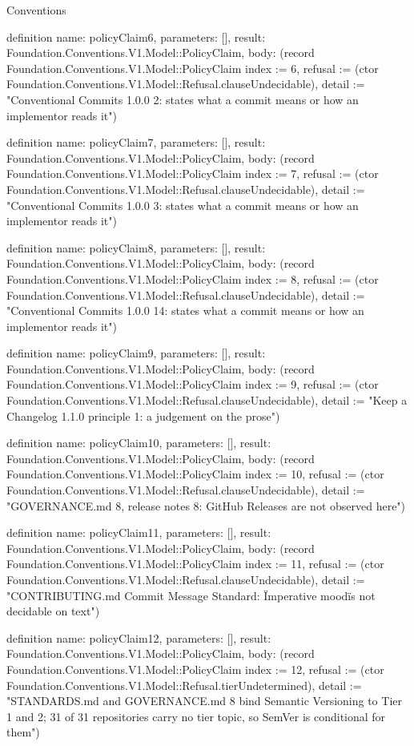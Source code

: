 \begin{lexlean}{Conventions}
\begin{semanticmodule}
definition{
  name: policyClaim6,
  parameters: [],
  result: Foundation.Conventions.V1.Model::PolicyClaim,
  body: (record Foundation.Conventions.V1.Model::PolicyClaim {index := 6, refusal := (ctor Foundation.Conventions.V1.Model::Refusal.clauseUndecidable), detail := "Conventional Commits 1.0.0 2: states what a commit means or how an implementor reads it"})
}

definition{
  name: policyClaim7,
  parameters: [],
  result: Foundation.Conventions.V1.Model::PolicyClaim,
  body: (record Foundation.Conventions.V1.Model::PolicyClaim {index := 7, refusal := (ctor Foundation.Conventions.V1.Model::Refusal.clauseUndecidable), detail := "Conventional Commits 1.0.0 3: states what a commit means or how an implementor reads it"})
}

definition{
  name: policyClaim8,
  parameters: [],
  result: Foundation.Conventions.V1.Model::PolicyClaim,
  body: (record Foundation.Conventions.V1.Model::PolicyClaim {index := 8, refusal := (ctor Foundation.Conventions.V1.Model::Refusal.clauseUndecidable), detail := "Conventional Commits 1.0.0 14: states what a commit means or how an implementor reads it"})
}

definition{
  name: policyClaim9,
  parameters: [],
  result: Foundation.Conventions.V1.Model::PolicyClaim,
  body: (record Foundation.Conventions.V1.Model::PolicyClaim {index := 9, refusal := (ctor Foundation.Conventions.V1.Model::Refusal.clauseUndecidable), detail := "Keep a Changelog 1.1.0 principle 1: a judgement on the prose"})
}

definition{
  name: policyClaim10,
  parameters: [],
  result: Foundation.Conventions.V1.Model::PolicyClaim,
  body: (record Foundation.Conventions.V1.Model::PolicyClaim {index := 10, refusal := (ctor Foundation.Conventions.V1.Model::Refusal.clauseUndecidable), detail := "GOVERNANCE.md 8, release notes 8: GitHub Releases are not observed here"})
}

definition{
  name: policyClaim11,
  parameters: [],
  result: Foundation.Conventions.V1.Model::PolicyClaim,
  body: (record Foundation.Conventions.V1.Model::PolicyClaim {index := 11, refusal := (ctor Foundation.Conventions.V1.Model::Refusal.clauseUndecidable), detail := "CONTRIBUTING.md Commit Message Standard: \"Imperative mood\" is not decidable on text"})
}

definition{
  name: policyClaim12,
  parameters: [],
  result: Foundation.Conventions.V1.Model::PolicyClaim,
  body: (record Foundation.Conventions.V1.Model::PolicyClaim {index := 12, refusal := (ctor Foundation.Conventions.V1.Model::Refusal.tierUndetermined), detail := "STANDARDS.md and GOVERNANCE.md 8 bind Semantic Versioning to Tier 1 and 2; 31 of 31 repositories carry no tier topic, so SemVer is conditional for them"})
}


\end{semanticmodule}
\end{lexlean}
